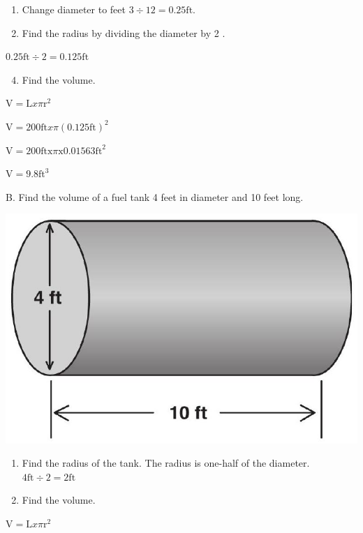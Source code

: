 \documentclass[10pt]{article}
\begin{document}
\begin{enumerate}
  \item Change diameter to feet $3 \div 12=0.25 \mathrm{ft}$.

  \item Find the radius by dividing the diameter by 2 .

\end{enumerate}
$0.25 \mathrm{ft} \div 2=0.125 \mathrm{ft}$

\begin{enumerate}
  \setcounter{enumi}{3}
  \item Find the volume.
\end{enumerate}
$\mathrm{V}=\mathrm{L} x \pi \mathrm{r}^{2}$

$\mathrm{V}=200 \mathrm{ft} x \pi(0.125 \mathrm{ft})^{2}$

$\mathrm{V}=200 \mathrm{ft} \mathrm{x} \pi \mathrm{x} 0.01563 \mathrm{ft}^{2}$

$\mathrm{V}=9.8 \mathrm{ft}^{3}$

B. Find the volume of a fuel tank 4 feet in diameter and 10 feet long.

\includegraphics[max width=\textwidth]{2022_09_11_72dbedc910e6e984560cg-63(1)}

\begin{enumerate}
  \item Find the radius of the tank. The radius is one-half of the diameter. $4 \mathrm{ft} \div 2=2 \mathrm{ft}$

  \item Find the volume.

\end{enumerate}
$\mathrm{V}=\mathrm{L} x \pi \mathrm{r}^{2}$
\end{document}
